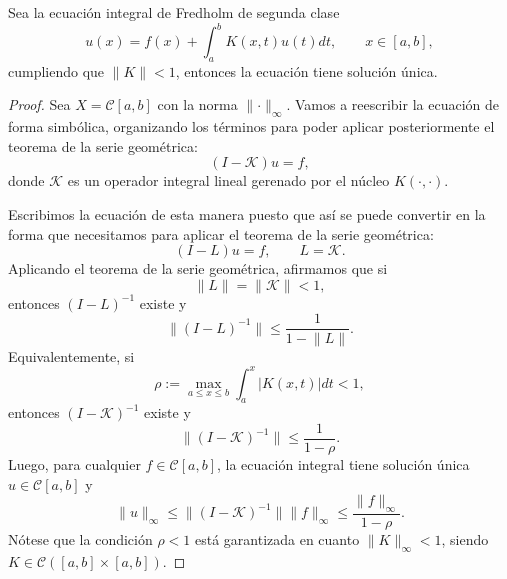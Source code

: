 \begin{corolario}\label{ej:1}
	Sea la ecuación integral de Fredholm de segunda clase
	\begin{equation}
	u(x) = f(x)+ \int_{a}^{b}K(x,t)u(t)dt, \qquad x \in [a,b],
	\end{equation}
	cumpliendo que $\lVert K \rVert < 1$, entonces la ecuación tiene solución única.
	\begin{proof}
		Sea $X = \mathcal{C}[a,b]$ con la norma $\lVert \cdot \rVert_\infty$. Vamos a reescribir la ecuación de forma simbólica, organizando los términos para poder aplicar posteriormente el teorema de la serie geométrica:
		\begin{equation}
			(I-\mathcal{K})u = f,
		\end{equation}
		donde $\mathcal{K}$ es un operador integral lineal gerenado por el núcleo $K (\cdot , \cdot )$.
		
		Escribimos la ecuación de esta manera puesto que así se puede convertir en la forma que necesitamos para aplicar el teorema de la serie geométrica:
		\begin{equation}
			(I-L)u = f, \qquad L = \mathcal{K}.
		\end{equation}
		Aplicando el teorema de la serie geométrica, afirmamos que si
		\begin{equation}
			\lVert L \rVert = \lVert \mathcal{K} \rVert < 1,
		\end{equation}
		entonces $(I-L)^{-1}$ existe y
		\begin{equation}
			\lVert(I-L)^{-1}\rVert \leqslant \dfrac{1}{1 - \lVert L \rVert}.
		\end{equation}
		Equivalentemente, si
		\begin{equation}
			\rho := \max_{a \leqslant x \leqslant b} \int_{a}^{x}|K(x,t)|dt < 1,
		\end{equation}
		entonces $(I - \mathcal{K})^{-1}$ existe y 
		\begin{equation}
			\lVert (I - \mathcal{K})^{-1}\rVert \leqslant \dfrac{1}{1 - \rho }.
		\end{equation}
		Luego, para cualquier $f \in \mathcal{C}[a,b]$, la ecuación integral tiene solución única $u \in \mathcal{C}[a,b]$ y 
		\begin{equation}
			\lVert u \rVert_\infty \leqslant \lVert (I - \mathcal{K})^{-1} \rVert \lVert f \rVert_\infty \leqslant \dfrac{\lVert f \rVert_\infty}{1 - \rho }.
		\end{equation}
		Nótese que la condición $\rho < 1$ está garantizada en cuanto $\lVert K \rVert_\infty < 1$, siendo $K \in \mathcal{C}([a,b]\times [a,b])$.
	\end{proof}
\end{corolario}
